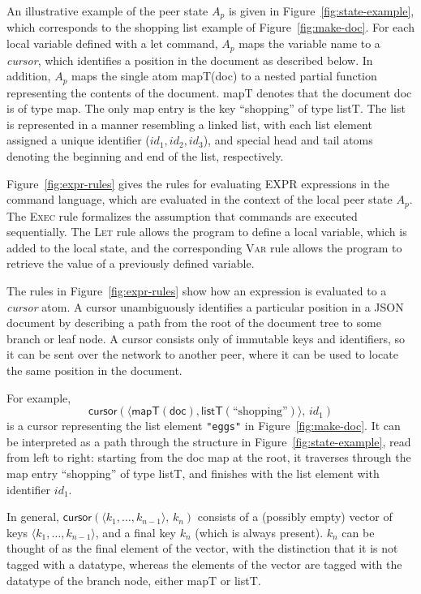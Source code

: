 \documentclass[a4paper,twocolumn,10pt]{article}
\begin{document}
An illustrative example of the peer state $A_p$ is given in Figure~\ref{fig:state-example}, which corresponds to the shopping list example of Figure~\ref{fig:make-doc}. For each local variable defined with a \textsf{let} command, $A_p$ maps the variable name to a \emph{cursor}, which identifies a position in the document as described below. In addition, $A_p$ maps the single atom \textsf{mapT(doc)} to a nested partial function representing the contents of the document. \textsf{mapT} denotes that the document \textsf{doc} is of type map. The only map entry is the key ``shopping'' of type \textsf{listT}. The list is represented in a manner resembling a linked list, with each list element assigned a unique identifier ($\mathit{id}_1, \mathit{id}_2, \mathit{id}_3$), and special \textsf{head} and \textsf{tail} atoms denoting the beginning and end of the list, respectively.

Figure~\ref{fig:expr-rules} gives the rules for evaluating EXPR expressions in the command language, which are evaluated in the context of the local peer state $A_p$. The \textsc{Exec} rule formalizes the assumption that commands are executed sequentially. The \textsc{Let} rule allows the program to define a local variable, which is added to the local state, and the corresponding \textsc{Var} rule allows the program to retrieve the value of a previously defined variable.

The rules in Figure~\ref{fig:expr-rules} show how an expression is evaluated to a \emph{cursor} atom. A cursor unambiguously identifies a particular position in a JSON document by describing a path from the root of the document tree to some branch or leaf node. A cursor consists only of immutable keys and identifiers, so it can be sent over the network to another peer, where it can be used to locate the same position in the document.

For example,
\[ \mathsf{cursor}(\langle \mathsf{mapT}(\mathsf{doc}), \mathsf{listT}(\text{``shopping''}) \rangle,\, \mathit{id}_1) \]
is a cursor representing the list element \verb|"eggs"| in Figure~\ref{fig:make-doc}. It can be interpreted as a path through the structure in Figure~\ref{fig:state-example}, read from left to right: starting from the \textsf{doc} map at the root, it traverses through the map entry ``shopping'' of type \textsf{listT}, and finishes with the list element with identifier $\mathit{id}_1$.

In general, $\mathsf{cursor}(\langle k_1, \dots, k_{n-1} \rangle,\, k_n)$ consists of a (possibly empty) vector of keys $\langle k_1, \dots, k_{n-1} \rangle$, and a final key $k_n$ (which is always present). $k_n$ can be thought of as the final element of the vector, with the distinction that it is not tagged with a datatype, whereas the elements of the vector are tagged with the datatype of the branch node, either \textsf{mapT} or \textsf{listT}.
\end{document}
